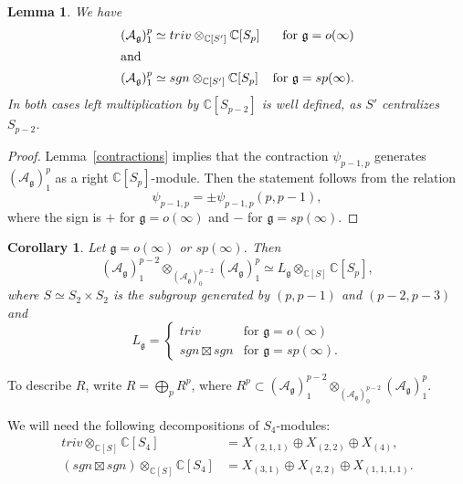 \documentclass{amsart}
\newcommand{\so}{o}
\renewcommand{\sp}{sp}
\renewcommand{\gg}{\mathfrak{g}}
\newtheorem{lemma}[thm]{Lemma}
\newtheorem{cor}[thm]{Corollary}
\theoremstyle{definition}
\numberwithin{equation}{section}
\begin{document}
\begin{lemma} We have
\begin{align*}
(\mathcal A_\gg)_1^p &\simeq triv \otimes_{\mathbb C[S']} \mathbb C[S_{p}] &\textrm{for } \gg=\so(\infty) \\
\intertext{and}
(\mathcal A_\gg)_1^p &\simeq sgn \otimes_{\mathbb C[S']} \mathbb C[S_{p}] &\textrm{for } \gg=\sp(\infty).
\end{align*}
In both cases left multiplication by $\mathbb C[S_{p-2}]$ is well defined, as $S'$ centralizes $S_{p-2}$.
\end{lemma}
\begin{proof} Lemma~\ref{contractions} implies that the contraction $\psi_{p-1,p}$ generates
  $(\mathcal A_\gg)_1^p$ as a right $\mathbb C[S_p]$-module.  Then the
  statement follows from the relation
$$\psi_{p-1,p}=\pm \psi_{p-1,p}(p,p-1),$$
where the sign is $+$ for  $\gg=\so(\infty)$ and $-$ for
$\gg=\sp(\infty)$.
\end{proof}
\begin{cor}  Let $\gg=\so(\infty)$ or $\sp(\infty)$. Then
$$(\mathcal A_\gg)_1^{p-2}\otimes_{(\mathcal A_\gg)_0^{p-2}} (\mathcal
  A_\gg)_1^{p}\simeq L_\gg\otimes_{\mathbb C[S]}\mathbb C[S_p],$$
where $S \simeq S_2\times S_2$ is the subgroup generated by $(p,p-1)$ and
  $(p-2,p-3)$ and 
  $$L_\gg=
  \begin{cases}
 triv & \textrm{for }\gg=\so(\infty) \\
 sgn\boxtimes sgn & \textrm{for } \gg =\sp(\infty).
 \end{cases}$$
\end{cor}

To describe $R$, write $R=\bigoplus_p R^{p}$, where 
$R^p\subset (\mathcal A_\gg)_1^{p-2}\otimes_{(\mathcal A_\gg)_0^{p-2}} (\mathcal  A_\gg)_1^{p}$.

We will need the following decompositions of $S_4$-modules:
\begin{align}\label{s4}
triv\otimes_{\mathbb C[S]}\mathbb C[S_4] & =X_{(2,1,1)}\oplus X_{(2,2)}\oplus X_{(4)}, \\
(sgn\boxtimes sgn)\otimes_{\mathbb C[S]}\mathbb C[S_4]& =X_{(3,1)}\oplus X_{(2,2)}\oplus X_{(1,1,1,1)}.
\end{align}
\end{document}
